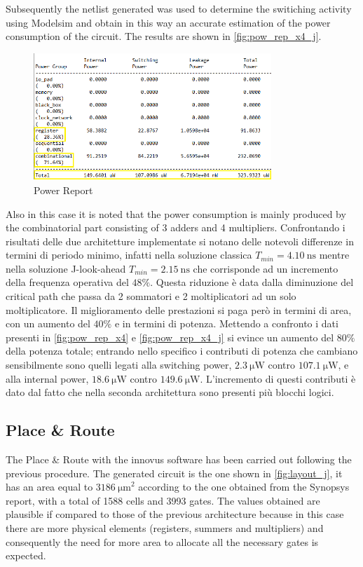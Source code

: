 Subsequently the netlist generated was used to determine the switiching activity using Modelsim and obtain in this way an accurate estimation of the power consumption of the circuit. The results are shown in \autoref{fig:pow_rep_x4_j}.

\begin{figure}[h]
	\center
	\includegraphics[width=0.8\textwidth]{images/report_power_x4_j_mod.png}
	\caption{Power Report}
	\label{fig:pow_rep_x4_j}
\end{figure}

Also in this case it is noted that the power consumption is mainly produced by the combinatorial part consisting of 3 adders and 4 multipliers.
Confrontando i risultati delle due architetture implementate si notano delle notevoli differenze in termini di periodo minimo, infatti nella soluzione classica $T_{min}=\SI{4.10}{\nano\second}$ mentre nella soluzione J-look-ahead $T_{min}=\SI{2.15}{\nano\second}$ che corrisponde ad un incremento della frequenza operativa del $48\%$. Questa riduzione è data dalla diminuzione del critical path che passa da 2 sommatori e 2 moltiplicatori ad un solo moltiplicatore. Il miglioramento delle prestazioni si paga però in termini di area, con un aumento del $40\%$ e in termini di potenza. Mettendo a confronto i dati presenti in \autoref{fig:pow_rep_x4} e \autoref{fig:pow_rep_x4_j} si evince un aumento del $80\%$ della potenza totale; entrando nello specifico i contributi di potenza che cambiano sensibilmente sono quelli legati alla switching power, $\SI{2.3}{\micro\watt}$ contro $\SI{107.1}{\micro\watt}$, e alla internal power, $\SI{18.6}{\micro\watt}$ contro $\SI{149.6}{\micro\watt}$. L'incremento di questi contributi è dato dal fatto che nella seconda architettura sono presenti più blocchi logici.

\subsection{Place \& Route}
The Place \& Route with the innovus software has been carried out following the previous procedure. The generated circuit is the one shown in \autoref{fig:layout_j}, it has an area equal to $\SI{3186}{\micro\meter}^2$ according to the one obtained from the Synopsys report, with a total of 1588 cells and 3993 gates. The values obtained are plausible if compared to those of the previous architecture because in this case there are more physical elements (registers, summers and multipliers) and consequently the need for more area to allocate all the necessary gates is expected.

